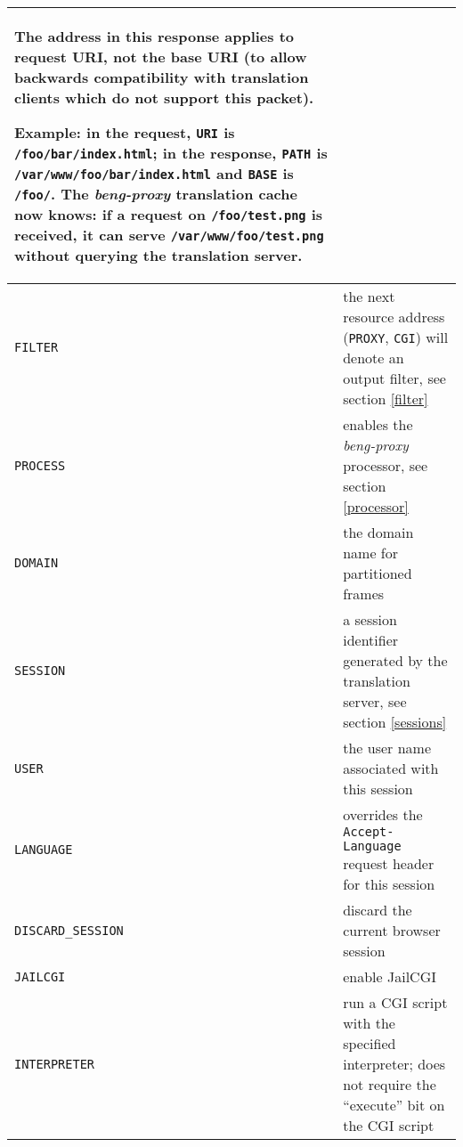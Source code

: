 \documentclass[a4paper,12pt]{article}
\begin{document}
\begin{longtable}{|l|p{8cm}|}
The address in this response applies to request URI, not the
base URI (to allow backwards compatibility with translation clients
which do not support this packet).

Example: in the request, \texttt{URI} is \texttt{/foo/bar/index.html};
in the response, \texttt{PATH} is \texttt{/var/www/foo/bar/index.html}
and \texttt{BASE} is \texttt{/foo/}.  The \emph{beng-proxy}
translation cache now knows: if a request on \texttt{/foo/test.png} is
received, it can serve \texttt{/var/www/foo/test.png} without querying
the translation server. \\

\hline

\texttt{FILTER} & the next resource address (\texttt{PROXY},
\texttt{CGI}) will denote an output filter, see section \ref{filter}
\\

\hline

\texttt{PROCESS} & enables the \emph{beng-proxy} processor, see
section \ref{processor} \\

\hline

\texttt{DOMAIN} & the domain name for partitioned frames \\

\hline

\texttt{SESSION} & a session identifier generated by the translation
server, see section \ref{sessions} \\

\hline

\texttt{USER} & the user name associated with this session \\

\hline

\texttt{LANGUAGE} & overrides the \texttt{Accept-Language} request
header for this session \\
\hline

\texttt{DISCARD\_SESSION} & discard the current browser session \\

\hline

\texttt{JAILCGI} & enable JailCGI \\

\hline

\texttt{INTERPRETER} & run a CGI script with the specified
interpreter; does not require the ``execute'' bit on the CGI script \\

\hline


\end{longtable}
\end{document}
